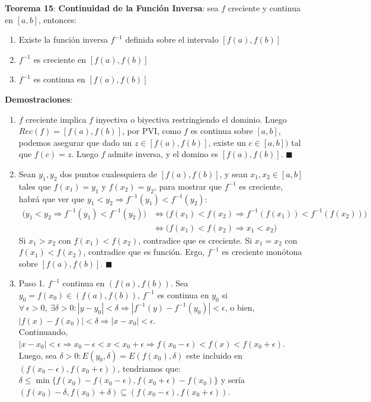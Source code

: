\documentclass[11pt,a4paper]{article}
\newcommand*{\QEDA}{\null\nobreak\hfill\ensuremath{\blacksquare}}
\begin{document}
\noindent \textbf{Teorema 15}: \textbf{Continuidad de la Funci\'on Inversa}: sea $f$ creciente y continua en $[a,b]$, entonces:
\begin{enumerate}
\item Existe la funci\'on inversa $f^{-1}$ definida sobre el intervalo $[f(a),f(b)]$
\item $f^{-1}$ es creciente en $[f(a),f(b)]$
\item $f^{-1}$ es continua en $[f(a),f(b)]$
\end{enumerate}
\textbf{Demostraciones}: 
\begin{enumerate}
\item $f$ creciente implica $f$ inyectiva o biyectiva restringiendo el dominio. Luego $Rec(f)=[f(a),f(b)]$, por PVI, como $f$ es continua sobre $[a,b]$, podemos asegurar que dado un $z\in[f(a),f(b)]$, existe un $c\in[a,b])$ tal que $f(c) = z$. Luego $f$ admite inversa, y el domino es $[f(a),f(b)]$. \QEDA
\item Sean $y_1, y_2$ dos puntos cualesquiera de $[f(a),f(b)]$, y sean $x_1, x_2 \in [a,b]$ tales que $f(x_1)=y_1$ y $f(x_2)=y_2$, para mostrar que $f^{-1}$ es creciente, habr\'a que ver que $y_1<y_2 \Rightarrow f^{-1}(y_1) < f^{-1}(y_2)$:
\begin{align*}
\bigg( y_1<y_2 \Rightarrow f^{-1}(y_1) < f^{-1}(y_2) \bigg) & \iff \bigg( f(x_1)<f(x_2) \Rightarrow f^{-1}(f(x_1)) < f^{-1}(f(x_2)) \bigg)\\
& \iff \bigg( f(x_1)<f(x_2) \Rightarrow x_1 <x_2 \bigg)
\end{align*}
Si $x_1 > x_2$ con $f(x_1)<f(x_2)$, contradice que es creciente. Si $x_1 = x_2$ con $f(x_1)<f(x_2)$, contradice que es funci\'on. Ergo, $f^{-1}$ es creciente mon\'otona sobre $[f(a),f(b)]$. \QEDA
\item Paso 1. $f^{-1}$ continua en $(f(a),f(b))$. Sea $y_0 = f(x_0) \in (f(a),f(b))$, $f^{-1}$ es continua en $y_0$ si $\forall\ \epsilon > 0,\ \exists \delta > 0 : |y - y_0| < \delta \Rightarrow |f^{-1}(y) - f^{-1}(y_0)| < \epsilon$, o bien, $|f(x)-f(x_0)|<\delta \Rightarrow |x-x_0| < \epsilon$.\\
Continuando, $|x-x_0| < \epsilon \Rightarrow x_0 - \epsilon < x < x_0 + \epsilon \Rightarrow f(x_0 - \epsilon) < f(x) < f(x_0 + \epsilon)$.\\
Luego, sea $\delta > 0 : E(y_0,\delta) = E(f(x_0),\delta)$ este incluido en $(f(x_0-\epsilon), f(x_0 + \epsilon))$, tendriamos que:\\
$\delta \leq \min\{f(x_0) - f(x_0 - \epsilon), f(x_0+\epsilon) - f(x_0)\}$ y ser\'ia $(f(x_0) - \delta, f(x_0) + \delta) \subseteq (f(x_0-\epsilon),f(x_0 + \epsilon))$. \\

\end{enumerate}
\end{document}
